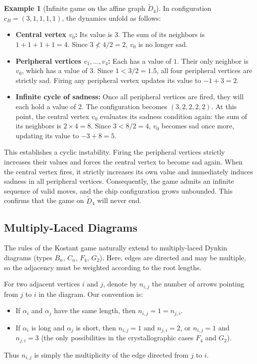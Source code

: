 \documentclass[11pt,a4paper]{amsart}
\theoremstyle{plain}
\theoremstyle{definition}
\newtheorem{example}[theorem]{Example}
\theoremstyle{remark}
\begin{document}
\begin{example}[Infinite game on the affine graph $\tilde{D}_4$]
	In configuration $c_B = (3, 1, 1, 1, 1)$, the dynamics unfold as follows:
	\begin{itemize}
		\item \textbf{Central vertex $v_0$:} Its value is $3$. The sum of its neighbors is $1+1+1+1=4$. Since $3 \not< 4/2 = 2$, $v_0$ is no longer sad.
		\item \textbf{Peripheral vertices $v_1, \dots, v_4$:} Each has a value of $1$. Their only neighbor is $v_0$, which has a value of $3$. Since $1 < 3/2 = 1.5$, all four peripheral vertices are strictly sad. Firing any peripheral vertex updates its value to $-1 + 3 = 2$. 
		\item \textbf{Infinite cycle of sadness:} Once all peripheral vertices are fired, they will each hold a value of $2$. The configuration becomes $(3, 2, 2, 2, 2)$. At this point, the central vertex $v_0$ evaluates its sadness condition again: the sum of its neighbors is $2 \times 4 = 8$. Since $3 < 8/2 = 4$, $v_0$ becomes sad once more, updating its value to $-3 + 8 = 5$.
	\end{itemize}
	
	This establishes a cyclic instability. Firing the peripheral vertices strictly increases their values and forces the central vertex to become sad again. When the central vertex fires, it strictly increases its own value and immediately induces sadness in all peripheral vertices. Consequently, the game admits an infinite sequence of valid moves, and the chip configuration grows unbounded. This confirms that the game on $\tilde{D}_4$ will never end.
\end{example}

\subsection{Multiply-Laced Diagrams}

The rules of the Kostant game naturally extend to multiply-laced Dynkin diagrams (types $B_n$, $C_n$, $F_4$, $G_2$). Here, edges are directed and may be multiple, so the adjacency must be weighted according to the root lengths.

For two adjacent vertices $i$ and $j$, denote by $n_{i,j}$ the number of arrows pointing from $j$ to $i$ in the diagram. Our convention is:
\begin{itemize}
    \item If $\alpha_i$ and $\alpha_j$ have the same length, then $n_{i,j}=1=n_{j,i}$.
    \item If $\alpha_i$ is long and $\alpha_j$ is short, then $n_{i,j}=1$ and $n_{j,i}=2$, or $n_{i,j}=1$ and $n_{j,i}=3$ (the only possibilities in the crystallographic cases $F_4$ and $G_2$).
\end{itemize}
Thus $n_{i,j}$ is simply the multiplicity of the edge directed from $j$ to $i$.
\end{document}

